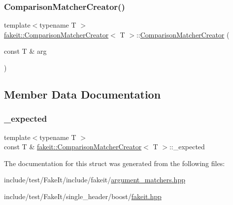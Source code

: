 \mbox{\label{structfakeit_1_1ComparisonMatcherCreator_ab8a8c71e965e7ab463c63fe514b3ce7a}} 
\subsubsection{\texorpdfstring{ComparisonMatcherCreator()}{ComparisonMatcherCreator()}\hspace{0.1cm}{\footnotesize\ttfamily [9/9]}}
{\footnotesize\ttfamily template$<$typename T $>$ \\
\mbox{\hyperlink{structfakeit_1_1ComparisonMatcherCreator}{fakeit\+::\+Comparison\+Matcher\+Creator}}$<$ T $>$\+::\mbox{\hyperlink{structfakeit_1_1ComparisonMatcherCreator}{Comparison\+Matcher\+Creator}} (\begin{DoxyParamCaption}\item[{const T \&}]{arg }\end{DoxyParamCaption})\hspace{0.3cm}{\ttfamily [inline]}}



\subsection{Member Data Documentation}
\mbox{\label{structfakeit_1_1ComparisonMatcherCreator_aae212812867eabbf7d87267cc657afaf}} 
\subsubsection{\texorpdfstring{\_expected}{\_expected}}
{\footnotesize\ttfamily template$<$typename T $>$ \\
const T \& \mbox{\hyperlink{structfakeit_1_1ComparisonMatcherCreator}{fakeit\+::\+Comparison\+Matcher\+Creator}}$<$ T $>$\+::\+\_\+expected}



The documentation for this struct was generated from the following files\+:\begin{DoxyCompactItemize}
\item 
include/test/\+Fake\+It/include/fakeit/\mbox{\hyperlink{argument__matchers_8hpp}{argument\+\_\+matchers.\+hpp}}\item 
include/test/\+Fake\+It/single\+\_\+header/boost/\mbox{\hyperlink{single__header_2boost_2fakeit_8hpp}{fakeit.\+hpp}}\end{DoxyCompactItemize}

